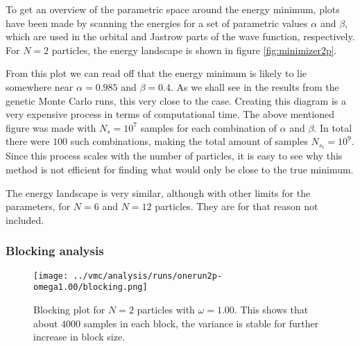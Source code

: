 \documentclass[aps,prb,twocolumn,floatfix]{revtex4}
\begin{document}
\begin{figure*}
    \centering
    \caption{Energy landscape for $N = 2$ particles with $\omega=1.00$.}
    \label{fig:minimizer2p}
\end{figure*}

To get an overview of the parametric space around the energy minimum, plots have been made by scanning the energies for a set of parametric values $\alpha$ and $\beta$, which are used in the orbital and Jastrow parts of the wave function, respectively. For $N=2$ particles, the energy landscape is shown in figure \ref{fig:minimizer2p}.

From this plot we can read off that the energy minimum is likely to lie somewhere near $\alpha = 0.985$ and $\beta = 0.4$. As we shall see in the results from the genetic Monte Carlo runs, this very close to the case. Creating this diagram is a very expensive process in terms of computational time. The above mentioned figure was made with $N_s = 10^7$ samples for each combination of $\alpha$ and $\beta$. In total there were $100$ such combinations, making the total amount of samples $N_{s_t} = 10^9$. Since this process scales with the number of particles, it is easy to see why this method is not efficient for finding what would only be close to the true minimum.

The energy landscape is very similar, although with other limits for the parameters, for $N=6$ and $N=12$ particles. They are for that reason not included.


\subsubsection{Blocking analysis}

\begin{figure}
    \centering
    \texttt{[image: ../vmc/analysis/runs/onerun2p-omega1.00/blocking.png]}
    \caption{Blocking plot for $N = 2$ particles with $\omega=1.00$. This shows that about $4000$ samples in each block, the variance is stable for further increase in block size.}
    \label{fig:blocking}
\end{figure}
\end{document}
